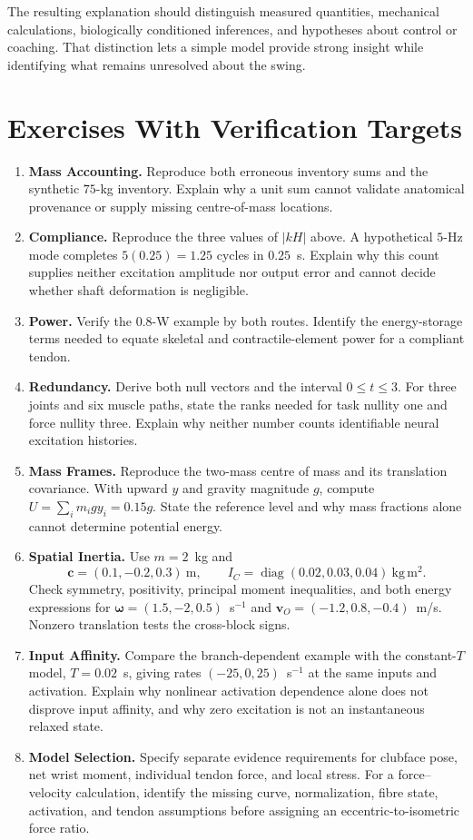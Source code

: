 The resulting explanation should distinguish measured quantities, mechanical
calculations, biologically conditioned inferences, and hypotheses about
control or coaching. That distinction lets a simple model provide strong
insight while identifying what remains unresolved about the swing.

\section*{Exercises With Verification Targets}
\begin{enumerate}
 \item \textbf{Mass Accounting.} Reproduce both erroneous inventory sums and
 the synthetic $75$-kg inventory. Explain why a unit sum cannot validate
 anatomical provenance or supply missing centre-of-mass locations.
 \item \textbf{Compliance.} Reproduce the three values of $|kH|$ above.
 A hypothetical $5$-Hz mode completes $5(0.25)=1.25$ cycles in $0.25$~s.
 Explain why this count supplies neither excitation amplitude nor output
 error and cannot decide whether shaft deformation is negligible.
 \item \textbf{Power.} Verify the $0.8$-W example by both routes. Identify
 the energy-storage terms needed to equate skeletal and contractile-element
 power for a compliant tendon.
 \item \textbf{Redundancy.} Derive both null vectors and the interval
 $0\leq t\leq3$. For three joints and six muscle paths, state the ranks
 needed for task nullity one and force nullity three. Explain why neither
 number counts identifiable neural excitation histories.
 \item \textbf{Mass Frames.} Reproduce the two-mass centre of mass and its
 translation covariance. With upward $y$ and gravity magnitude $g$, compute
 $U=\sum_i m_i g y_i=0.15g$. State the reference level and why mass
 fractions alone cannot determine potential energy.
 \item \textbf{Spatial Inertia.} Use $m=2$~kg and
 \[
 \bm c=(0.1,-0.2,0.3)\ \mathrm m,\qquad
 I_C=\operatorname{diag}(0.02,0.03,0.04)\ \mathrm{kg\,m^2}.
 \]
 Check symmetry,
 positivity, principal moment inequalities, and both energy expressions for
 $\bm\omega=(1.5,-2,0.5)$~s$^{-1}$ and $\bm v_O=(-1.2,0.8,-0.4)$~m/s.
 Nonzero translation tests the cross-block signs.
 \item \textbf{Input Affinity.} Compare the branch-dependent example with
 the constant-$T$ model, $T=0.02$~s, giving rates $(-25,0,25)$~s$^{-1}$
 at the same inputs and activation. Explain
 why nonlinear activation dependence alone does not disprove input affinity,
 and why zero excitation is not an instantaneous relaxed state.
 \item \textbf{Model Selection.} Specify separate evidence requirements for
 clubface pose, net wrist moment, individual tendon force, and local stress.
 For a force--velocity calculation, identify the missing curve, normalization,
 fibre state, activation, and tendon assumptions before assigning an
 eccentric-to-isometric force ratio.
\end{enumerate}

